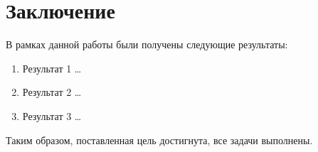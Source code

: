 \chapter*{Заключение}

В рамках данной работы были получены следующие результаты:
\begin{enumerate}
    \item Результат 1 \ldots
    \item Результат 2 \ldots
    \item Результат 3 \ldots
\end{enumerate}

Таким образом, поставленная цель достигнута, все задачи выполнены.
